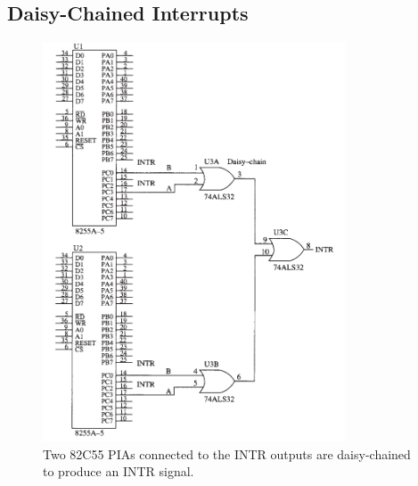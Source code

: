\subsection{Daisy-Chained Interrupts}
\begin{figure}[h!]
  \includegraphics[width = 0.8\textwidth]{./figures/Daisy_Chain.png}
  \caption{Two 82C55 PIAs connected to the INTR outputs are daisy-chained to produce an INTR signal.}
  \label{fig: Daisy_Chain}
\end{figure}

